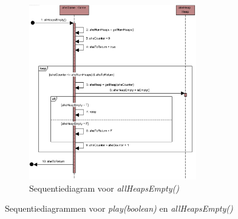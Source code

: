 \begin{landscape}
\begin{figure}
\begin{subfigure}{\textwidth}
			\includegraphics[width=0.8\textwidth]{chap-evaluatie/allHeapsEmpty.png}
			\caption{Sequentiediagram voor \textit{allHeapsEmpty()}}
			\label{fig:nim-allHeapsEmpty}
		\end{subfigure}
		\caption{Sequentiediagrammen voor \textit{play(boolean)} en \textit{allHeapsEmpty()}}
		\label{fig:nim-play-ahe}
	\end{figure}
\end{landscape}

